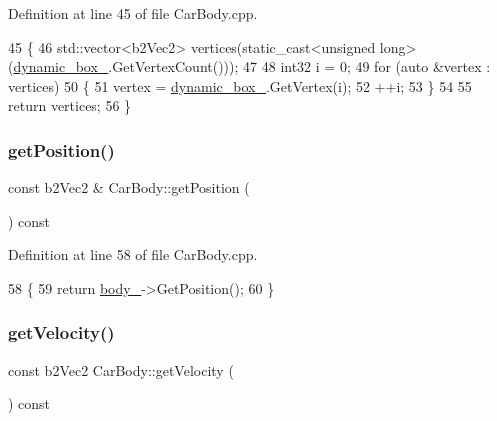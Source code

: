 Definition at line 45 of file Car\+Body.\+cpp.


\begin{DoxyCode}
45                                             \{
46     std::vector<b2Vec2> vertices(static\_cast<unsigned long>(\hyperlink{classCarBody_aff94f91206a0bdfa00257e68bfcc5633}{dynamic\_box\_}.GetVertexCount()));
47 
48     int32 i = 0;
49     \textcolor{keywordflow}{for} (\textcolor{keyword}{auto} &vertex : vertices)
50     \{
51         vertex = \hyperlink{classCarBody_aff94f91206a0bdfa00257e68bfcc5633}{dynamic\_box\_}.GetVertex(i);
52         ++i;
53     \}
54 
55     \textcolor{keywordflow}{return} vertices;
56 \}
\end{DoxyCode}
\mbox{\label{classCarBody_aa58f688a6f2ae687870daa41b73db625}} 
\subsubsection{\texorpdfstring{get\+Position()}{getPosition()}}
{\footnotesize\ttfamily const b2\+Vec2 \& Car\+Body\+::get\+Position (\begin{DoxyParamCaption}{ }\end{DoxyParamCaption}) const}



Definition at line 58 of file Car\+Body.\+cpp.


\begin{DoxyCode}
58                                          \{
59     \textcolor{keywordflow}{return} \hyperlink{classCarBody_aa460930fa1548d1987051dfa6f68c897}{body\_}->GetPosition();
60 \}
\end{DoxyCode}
\mbox{\label{classCarBody_aac28c2ac7e21b88ebc85f9999bac9b3d}} 
\subsubsection{\texorpdfstring{get\+Velocity()}{getVelocity()}}
{\footnotesize\ttfamily const b2\+Vec2 Car\+Body\+::get\+Velocity (\begin{DoxyParamCaption}{ }\end{DoxyParamCaption}) const}



